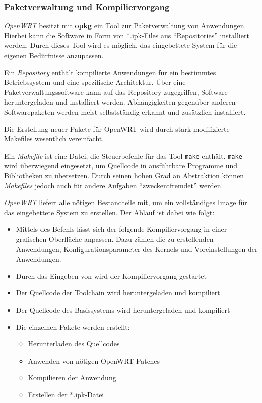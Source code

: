  \subsubsection*{Paketverwaltung
und Kompiliervorgang} \emph{OpenWRT} besitzt mit \textbf{opkg} ein Tool zur Paketverwaltung von
Anwendungen.
Hierbei kann die Software in Form von *.ipk-Files aus "`Repositories"'
installiert werden. Durch dieses Tool wird es möglich, das eingebettete System
für die eigenen Bedürfnisse anzupassen.
\begin{definition}[Repository]
Ein \emph{Repository} enthält kompilierte Anwendungen für ein bestimmtes
Betriebssystem und eine spezifische Architektur. Über eine
Paketverwaltungssoftware kann auf das Repository zugegriffen, Software
heruntergeladen und installiert werden. Abhängigkeiten gegenüber anderen
Softwarepaketen werden meist selbstständig erkannt und zusätzlich installiert.
\end{definition}
Die Erstellung neuer Pakete für OpenWRT wird durch stark modifizierte Makefiles
wesentlich vereinfacht.
 \begin{definition}[Makefile]
Ein \emph{Makefile} ist eine Datei, die Steuerbefehle für das Tool
\texttt{make} enthält. \texttt{make} wird überwiegend eingesetzt, um Quellcode
in ausführbare Programme und Bibliotheken zu übersetzen. Durch seinen hohen
Grad an Abstraktion können \emph{Makefiles} jedoch auch für andere Aufgaben
"`zweckentfremdet"' werden.
\end{definition}

\begin{minipage}[c]{\textwidth}
\emph{OpenWRT} liefert alle nötigen Bestandteile mit, um ein vollständiges Image
für das eingebettete System zu erstellen.
Der Ablauf ist dabei wie folgt:
\begin{itemize}
  \item Mittels des Befehls  lässt sich der folgende
  Kompiliervorgang in einer grafischen Oberfläche anpassen. Dazu zählen die zu
  erstellenden Anwendungen, Konfigurationsparameter des Kernels und
  Voreinstellungen der Anwendungen.
  \item Durch das Eingeben von  wird der Kompiliervorgang
  gestartet
  \item Der Quellcode der Toolchain wird heruntergeladen und kompiliert
  \item Der Quellcode des Basissystems wird heruntergeladen und kompiliert
  \item Die einzelnen Pakete werden erstellt:
  \begin{itemize}
    \item Herunterladen des Quellcodes
    \item Anwenden von nötigen OpenWRT-Patches
    \item Kompilieren der Anwendung
    \item Erstellen der *.ipk-Datei
  \end{itemize}
\end{itemize}
\end{minipage}

